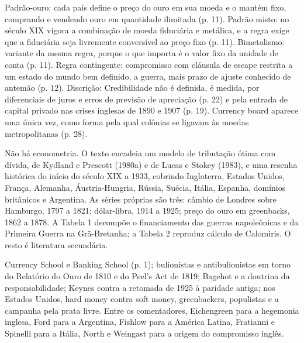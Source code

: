 Padrão-ouro: cada país define o preço do ouro em sua moeda e o mantém fixo,
comprando e vendendo ouro em quantidade ilimitada (p. 11). Padrão misto: no
século XIX vigora a combinação de moeda fiduciária e metálica, e a regra exige
que a fiduciária seja livremente conversível ao preço fixo (p. 11).
Bimetalismo: variante da mesma regra, porque o que importa é o valor fixo da
unidade de conta (p. 11). Regra contingente: compromisso com cláusula de escape
restrita a um estado do mundo bem definido, a guerra, mais prazo de ajuste
conhecido de antemão (p. 12). Discrição:
Credibilidade não é definida, é medida, por diferenciais de juros e erros de
previsão de apreciação (p. 22) e pela entrada de capital privado nas crises
inglesas de 1890 e 1907 (p. 19). Currency board aparece uma única vez, como
forma pela qual colônias se ligavam às moedas metropolitanas (p. 28).

Não há econometria. O texto encadeia um modelo de tributação ótima com dívida,
de Kydland e Prescott (1980a) e de Lucas e Stokey (1983), e uma resenha
histórica do início do século XIX a 1933, cobrindo Inglaterra, Estados Unidos,
França, Alemanha, Áustria-Hungria, Rússia, Suécia, Itália, Espanha, domínios
britânicos e Argentina. As séries próprias são três: câmbio de Londres sobre
Hamburgo, 1797 a 1821; dólar-libra, 1914 a 1925; preço do ouro em greenbacks,
1862 a 1878. A Tabela 1 decompõe o financiamento das guerras napoleônicas e da
Primeira Guerra na Grã-Bretanha; a Tabela 2 reproduz cálculo de Calomiris. O
resto é literatura secundária.

Currency School e Banking School (p. 1); bulionistas e antibulionistas em torno
do Relatório do Ouro de 1810 e do Peel's Act de 1819; Bagehot e a doutrina da
responsabilidade; Keynes contra a retomada de 1925 à paridade antiga; nos
Estados Unidos, hard money contra soft money, greenbackers, populistas e a
campanha pela prata livre. Entre os comentadores, Eichengreen para a hegemonia
inglesa, Ford para a Argentina, Fishlow para a América Latina, Fratianni e
Spinelli para a Itália, North e Weingast para a origem do compromisso inglês.

